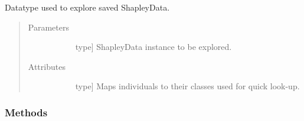 \documentclass[letterpaper,10pt,english]{sphinxmanual}
\begin{document}
\begin{fulllineitems}
\label{\detokenize{index:methylnet.interpretation_classes.ShapleyDataExplorer}}
Datatype used to explore saved ShapleyData.
\begin{quote}\begin{description}
\item[{Parameters}] \leavevmode\begin{description}
\item[{}] \leavevmode{[}type{]}
ShapleyData instance to be explored.

\end{description}

\item[{Attributes}] \leavevmode\begin{description}
\item[{}] \leavevmode{[}type{]}
Maps individuals to their classes used for quick look-up.

\item[{}] \leavevmode
\end{description}

\end{description}\end{quote}
\subsubsection*{Methods}


\begin{savenotes}\sphinxatlongtablestart\begin{longtable}{}
\hline

\endfirsthead

%
{}\\
\hline

\endhead

\hline
{}\\
\endfoot

\endlastfoot


\end{longtable}
\end{savenotes}
\end{fulllineitems}
\end{document}
